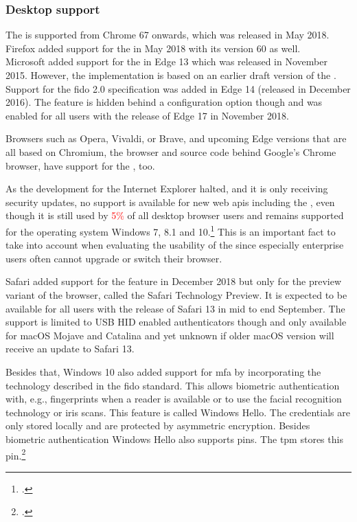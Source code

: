 \subsubsection{Desktop support}

The \wa{} is supported from Chrome 67 onwards, which was released in May 2018. Firefox added support for the \wa{} in May 2018 with its version 60 as well.\\
Microsoft added support for the \wa{} in Edge 13 which was released in November 2015. However, the implementation is based on an earlier draft version of the \wa. Support for the \gls{fido} 2.0 specification was added in Edge 14 (released in December 2016). The feature is hidden behind a configuration option though and was enabled for all users with the release of Edge 17 in November 2018.

Browsers such as Opera, Vivaldi, or Brave, and upcoming Edge versions that are all based on Chromium, the browser and source code behind Google's Chrome browser, have support for the \wa, too.

As the development for the Internet Explorer halted, and it is only receiving security updates, no support is available for new web \glspl{api} including the \wa, even though it is still used by \textcolor{red}{5\%} of all desktop browser users and remains supported for the operating system Windows 7, 8.1 and 10.\footcite[See][]{ie-support}
 This is an important fact to take into account when evaluating the usability of the \wa{} since especially enterprise users often cannot upgrade or switch their browser.

Safari added support for the \wa{} feature in December 2018 but only for the preview variant of the browser, called the Safari Technology Preview. It is expected to be available for all users with the release of Safari 13 in mid to end September. The support is limited to USB HID enabled authenticators though and only available for macOS Mojave and Catalina and yet unknown if older macOS version will receive an update to Safari 13.

Besides that, Windows 10 also added support for \gls{mfa} by incorporating the technology described in the \gls{fido} standard. This allows biometric authentication with, e.g., fingerprints when a reader is available or to use the facial recognition technology or iris scans. This feature is called \frqq Windows Hello\flqq{}. The credentials are only stored locally and are protected by asymmetric encryption. Besides biometric authentication Windows Hello also supports \glspl{pin}. The \gls{tpm} stores this \gls{pin}.\footcite[See][]{201612}

